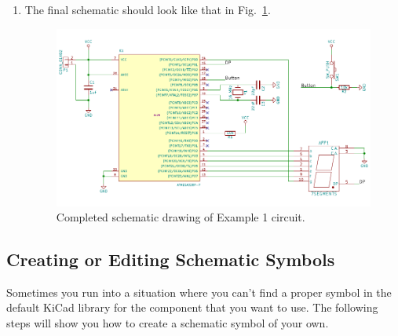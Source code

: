 \documentclass[12pt,letterpaper]{scrartcl}
\begin{document}
\begin{enumerate}
	\item The final schematic should look like that in Fig.~\ref{fig:example1-schematic-final}.
		\begin{figure}[h]
			\centering
			\includegraphics{example1-schematic-final}
			\caption{Completed schematic drawing of Example 1 circuit.}
			\label{fig:example1-schematic-final}
		\end{figure}		
\end{enumerate}

\newpage
\subsection{Creating or Editing Schematic Symbols}
Sometimes you run into a situation where you can’t find a proper symbol in the default KiCad library for the component that you want to use. The following steps will show you how to create a schematic symbol of your own. 
\end{document}
